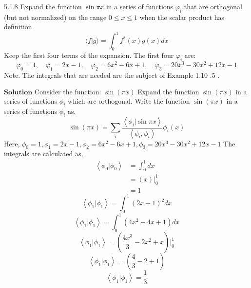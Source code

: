 \newpage

\begin{mybox}{5.1.8}
Expand the function $\sin \pi x$ in a series of functions $\varphi_{i}$ that are orthogonal (but not normalized) on the range $0 \leq x \leq 1$ when the scalar product has definition
$$
\langle f | g\rangle=\int_{0}^{1} f^{*}(x) g(x) d x
$$
Keep the first four terms of the expansion. The first four $\varphi_{i}$ are:
$$
\varphi_{0}=1, \quad \varphi_{1}=2 x-1, \quad \varphi_{2}=6 x^{2}-6 x+1, \quad \varphi_{3}=20 x^{3}-30 x^{2}+12 x-1
$$
Note. The integrals that are needed are the subject of Example 1.10 .5 .
\end{mybox}

$\boxed{\textbf{Solution}}$ Consider the function:
$\sin (\pi x)$
Expand the function $\sin (\pi x)$ in a series of functions $\phi_{i}$ which are orthogonal. Write the function $\sin (\pi x)$ in a series of functions $\phi_{i}$ as,
$$
\sin (\pi x)=\sum_{i} \frac{\left\langle\phi_{i} | \sin \pi x\right\rangle}{\left\langle\phi_{i}, \phi_{i}\right\rangle} \phi_{i}(x)
$$
Here, $\phi_{0}=1, \phi_{1}=2 x-1, \phi_{2}=6 x^{2}-6 x+1, \phi_{3}=20 x^{3}-30 x^{2}+12 x-1$
The integrals are calculated as,
$$
\begin{aligned}
\left\langle\phi_{0} | \phi_{0}\right\rangle &=\int_{0}^{1} d x \\
&=(x)\Big|_{0}^{1} \\
&=1
\end{aligned}
$$
$$
\left\langle\phi_{1} | \phi_{1}\right\rangle=\int_{0}^{1}(2 x-1)^{2} d x
$$
$$\left\langle\phi_{1} | \phi_{1}\right\rangle=\int_{0}^{1}\left(4 x^{2}-4 x+1\right) d x$$
$$\left\langle\phi_{1} | \phi_{1}\right\rangle=\left(\frac{4 x^{3}}{3}-2 x^{2}+x\right)\Bigg|_{0}^{1}$$
$$\left\langle\phi_{1} | \phi_{1}\right\rangle=\left(\frac{4}{3}-2+1\right)$$
$$\left\langle\phi_{1} | \phi_{1}\right\rangle=\frac{1}{3}$$


